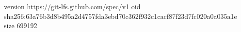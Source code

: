 version https://git-lfs.github.com/spec/v1
oid sha256:63a76b3d8b495a2d4757fda3ebd70c362f932c1cacf87f23d7fc020a0a035a1e
size 699192
